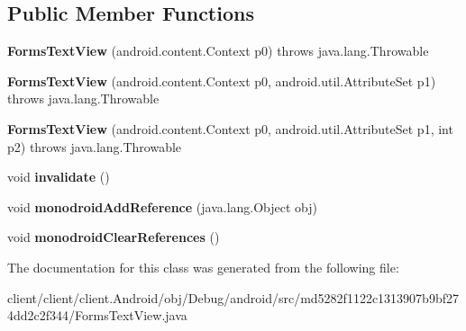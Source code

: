 \subsection*{Public Member Functions}
\begin{DoxyCompactItemize}
\item 
\hypertarget{classmd5282f1122c1313907b9bf274dd2c2f344_1_1FormsTextView_a8349c4f9496eda8bacf2a3771ce4c836}{}{\bfseries Forms\+Text\+View} (android.\+content.\+Context p0)  throws java.\+lang.\+Throwable 	\label{classmd5282f1122c1313907b9bf274dd2c2f344_1_1FormsTextView_a8349c4f9496eda8bacf2a3771ce4c836}

\item 
\hypertarget{classmd5282f1122c1313907b9bf274dd2c2f344_1_1FormsTextView_a4618e575a139b67be38dfc9bf1a9cd0d}{}{\bfseries Forms\+Text\+View} (android.\+content.\+Context p0, android.\+util.\+Attribute\+Set p1)  throws java.\+lang.\+Throwable 	\label{classmd5282f1122c1313907b9bf274dd2c2f344_1_1FormsTextView_a4618e575a139b67be38dfc9bf1a9cd0d}

\item 
\hypertarget{classmd5282f1122c1313907b9bf274dd2c2f344_1_1FormsTextView_ae7bb61a7f1f9e83bb9eed1daa9b04b0d}{}{\bfseries Forms\+Text\+View} (android.\+content.\+Context p0, android.\+util.\+Attribute\+Set p1, int p2)  throws java.\+lang.\+Throwable 	\label{classmd5282f1122c1313907b9bf274dd2c2f344_1_1FormsTextView_ae7bb61a7f1f9e83bb9eed1daa9b04b0d}

\item 
\hypertarget{classmd5282f1122c1313907b9bf274dd2c2f344_1_1FormsTextView_aa122285b344500e3083345f7e841e9cb}{}void {\bfseries invalidate} ()\label{classmd5282f1122c1313907b9bf274dd2c2f344_1_1FormsTextView_aa122285b344500e3083345f7e841e9cb}

\item 
\hypertarget{classmd5282f1122c1313907b9bf274dd2c2f344_1_1FormsTextView_aa649abfe7c11a308205a122b037fbbb2}{}void {\bfseries monodroid\+Add\+Reference} (java.\+lang.\+Object obj)\label{classmd5282f1122c1313907b9bf274dd2c2f344_1_1FormsTextView_aa649abfe7c11a308205a122b037fbbb2}

\item 
\hypertarget{classmd5282f1122c1313907b9bf274dd2c2f344_1_1FormsTextView_a7a326f4d3a62fc41337f41755ed77bfd}{}void {\bfseries monodroid\+Clear\+References} ()\label{classmd5282f1122c1313907b9bf274dd2c2f344_1_1FormsTextView_a7a326f4d3a62fc41337f41755ed77bfd}

\end{DoxyCompactItemize}


The documentation for this class was generated from the following file\+:\begin{DoxyCompactItemize}
\item 
client/client/client.\+Android/obj/\+Debug/android/src/md5282f1122c1313907b9bf274dd2c2f344/Forms\+Text\+View.\+java\end{DoxyCompactItemize}
